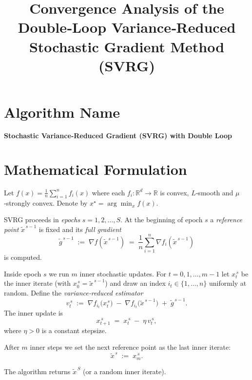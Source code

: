 \documentclass[11pt]{article}
\begin{document}
\title{Convergence Analysis of the Double‑Loop Variance‑Reduced Stochastic Gradient Method (SVRG)}
\author{}
\date{}
\maketitle

\section*{Algorithm Name}
\textbf{Stochastic Variance‑Reduced Gradient (SVRG) with Double Loop}  

\section*{Mathematical Formulation}
Let $f(x)=\frac{1}{n}\sum_{i=1}^{n} f_i(x)$ where each $f_i:\mathbb{R}^d\rightarrow\mathbb{R}$ is convex, $L$‑smooth and $\mu$‑strongly convex.  
Denote by $x^\star=\arg\min_x f(x)$.  

SVRG proceeds in \emph{epochs} $s=1,2,\dots,S$.  
At the beginning of epoch $s$ a \emph{reference point} $\tilde{x}^{\,s-1}$ is fixed and its \emph{full gradient}
\[
\tilde{g}^{\,s-1}\;:=\;\nabla f(\tilde{x}^{\,s-1}) \;=\; \frac{1}{n}\sum_{i=1}^{n}\nabla f_i(\tilde{x}^{\,s-1})
\tag{1}
\]
is computed.  

Inside epoch $s$ we run $m$ inner stochastic updates.  
For $t=0,1,\dots,m-1$ let $x_t^{\,s}$ be the inner iterate (with $x_0^{\,s}= \tilde{x}^{\,s-1}$) and draw an index $i_t\!\in\!\{1,\dots,n\}$ uniformly at random.  
Define the \emph{variance‑reduced estimator}
\[
v_t^{\,s}\;:=\;\nabla f_{i_t}\!\bigl(x_t^{\,s}\bigr)\;-\;\nabla f_{i_t}\!\bigl(\tilde{x}^{\,s-1}\bigr)\;+\;\tilde{g}^{\,s-1}.
\tag{2}
\]
The inner update is
\[
x_{t+1}^{\,s}\;=\;x_t^{\,s}\;-\;\eta\, v_t^{\,s},
\tag{3}
\]
where $\eta>0$ is a constant stepsize.  

After $m$ inner steps we set the next reference point as the last inner iterate:
\[
\tilde{x}^{\,s}\;:=\;x_{m}^{\,s}.
\tag{4}
\]

The algorithm returns $\tilde{x}^{\,S}$ (or a random inner iterate).

\end{document}
